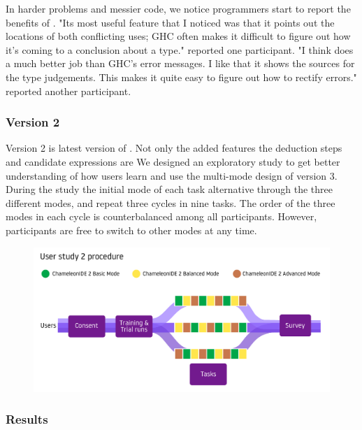 In harder problems and messier code, we notice programmers start to report the benefits of \chameleon{}. "Its most useful feature that I noticed was that it points out the locations of both conflicting uses; GHC often makes it difficult to figure out how it's coming to a conclusion about a type." reported one participant. "I think \chameleon{}  does a much better job than GHC's error messages. I like that it shows the sources for the type judgements. This makes it quite easy to figure out how to rectify errors." reported another participant.



\subsubsection{\textbf{Version 2}}  \label{sub:us4}

Version 2 is latest version of \chameleon{}. Not only the added features the deduction steps and candidate expressions are We designed an exploratory study to get better understanding of how users learn and use the multi-mode design of \chameleon{} version 3. During the study the initial mode of each task alternative through the three different modes, and repeat three cycles in nine tasks. The order of the three modes in each cycle is counterbalanced among all participants. However, participants are free to switch to other modes at any time. 


\begin{figure}[h]
    \centering
    \includegraphics[width=\linewidth]{images/procedure-2.pdf}
    \caption{}
    \label{fig:study-process}
\end{figure}

\subsubsection*{\textbf{Results}} 

